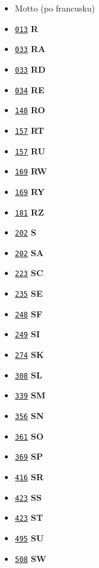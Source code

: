 \documentclass[12]{mwart}
\begin{document}
\begin{itemize}
\item \href{\pav{5}{15}}{\texttt{}} Motto (po francusku)
\item \href{\pav{5}{21}}{\texttt{013}} \textbf{R}
\item \href{\pav{5}{41}}{\texttt{033}} \textbf{RA}
\item \href{\pav{5}{41}}{\texttt{033}} \textbf{RD}
\item \href{\pav{5}{42}}{\texttt{034}} \textbf{RE}
\item \href{\pav{5}{156}}{\texttt{148}} \textbf{RO}
\item \href{\pav{5}{165}}{\texttt{157}} \textbf{RT}
\item \href{\pav{5}{165}}{\texttt{157}} \textbf{RU}
\item \href{\pav{5}{177}}{\texttt{169}} \textbf{RW}
\item \href{\pav{5}{177}}{\texttt{169}} \textbf{RY}
\item \href{\pav{5}{189}}{\texttt{181}} \textbf{RZ}
\item \href{\pav{5}{210}}{\texttt{202}} \textbf{S}
\item \href{\pav{5}{210}}{\texttt{202}} \textbf{SA}
\item \href{\pav{5}{231}}{\texttt{223}} \textbf{SC}
\item \href{\pav{5}{243}}{\texttt{235}} \textbf{SE}
\item \href{\pav{5}{256}}{\texttt{248}} \textbf{SF}
\item \href{\pav{5}{257}}{\texttt{249}} \textbf{SI}
\item \href{\pav{5}{282}}{\texttt{274}} \textbf{SK}
\item \href{\pav{5}{316}}{\texttt{308}} \textbf{SL}
\item \href{\pav{5}{347}}{\texttt{339}} \textbf{SM}
\item \href{\pav{5}{364}}{\texttt{356}} \textbf{SN}
\item \href{\pav{5}{369}}{\texttt{361}} \textbf{SO}
\item \href{\pav{5}{377}}{\texttt{369}} \textbf{SP}
\item \href{\pav{5}{424}}{\texttt{416}} \textbf{SR}
\item \href{\pav{5}{431}}{\texttt{423}} \textbf{SS}
\item \href{\pav{5}{431}}{\texttt{423}} \textbf{ST}
\item \href{\pav{5}{503}}{\texttt{495}} \textbf{SU}
\item \href{\pav{5}{516}}{\texttt{508}} \textbf{SW}

\end{itemize}
\end{document}
